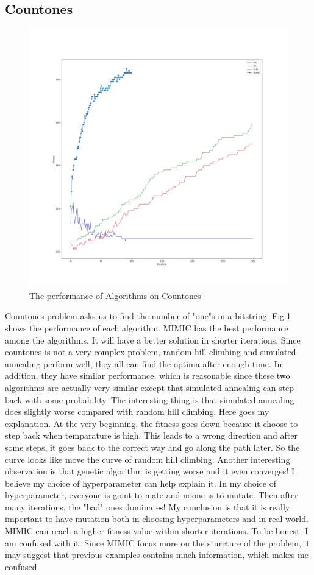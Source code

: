 \documentclass[11pt]{article}
\begin{document}
\subsection{Countones}
\begin{figure}[h!]
  \includegraphics[width=\linewidth]{../plot/countones_plot.jpg}
  \caption{The performance of Algorithms on Countones}
  \label{fig:countones}
\end{figure}
Countones problem asks us to find the number of "one"s in a bitstring. Fig.\ref{fig:countones} shows the performance of each algorithm. MIMIC has the best performance among the algorithms. It will have a better solution in shorter iterations. Since countones is not a very complex problem, random hill climbing and simulated annealing perform well, they all can find the optima after enough time. In addition, they have similar performance, which is reasonable since these two algorithms are actually very similar except that simulated annealing can step back with some probability. The interesting thing is that simulated annealing does slightly worse compared with random hill climbing. Here goes my explanation. At the very beginning, the fitness goes down because it choose to step back when temparature is high. This leads to a wrong direction and after some steps, it goes back to the correct way and go along the path later. So the curve looks like move the curve of random hill climbing. Another interesting observation is that genetic algorithm is getting worse and it even converges! I believe my choice of hyperparameter can help explain it. In my choice of hyperparameter, everyone is goint to mate and noone is to mutate. Then after many iterations, the "bad" ones dominates! My conclusion is that it is really important to have mutation both in choosing hyperparameters and in real world. MIMIC can reach a higher fitness value within shorter iterations. To be honest, I am confused with it. Since MIMIC focus more on the sturcture of the problem, it may suggest that previous examples contains much information, which makes me confused.\\
\end{document}
